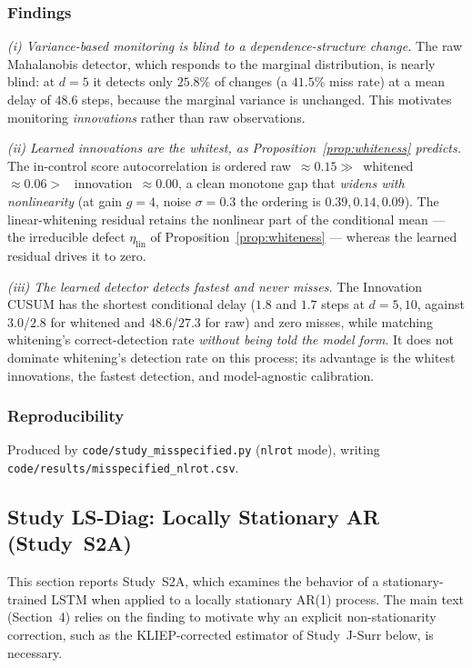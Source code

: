 \documentclass[bj,authoryear]{imsart}
\theoremstyle{plain}
\theoremstyle{definition}
\begin{document}
\subsubsection*{Findings}
\emph{(i) Variance-based monitoring is blind to a dependence-structure
change.}  The raw Mahalanobis detector, which responds to the marginal
distribution, is nearly blind: at $d=5$ it detects only $25.8\%$ of changes
(a $41.5\%$ miss rate) at a mean delay of $48.6$ steps, because the marginal
variance is unchanged.  This motivates monitoring \emph{innovations} rather
than raw observations.

\emph{(ii) Learned innovations are the whitest, as
Proposition~\ref{prop:whiteness} predicts.}  The in-control score
autocorrelation is ordered raw~$\approx0.15\gg$~whitened~$\approx0.06>$~
innovation~$\approx0.00$, a clean monotone gap that \emph{widens with
nonlinearity} (at gain $g=4$, noise $\sigma=0.3$ the ordering is
$0.39,0.14,0.09$).  The linear-whitening residual retains the nonlinear part
of the conditional mean --- the irreducible defect $\eta_{\mathrm{lin}}$ of
Proposition~\ref{prop:whiteness} --- whereas the learned residual drives it
to zero.

\emph{(iii) The learned detector detects fastest and never misses.}  The
Innovation CUSUM has the shortest conditional delay ($1.8$ and $1.7$ steps at
$d=5,10$, against $3.0$/$2.8$ for whitened and $48.6$/$27.3$ for raw) and zero
misses, while matching whitening's correct-detection rate \emph{without being
told the model form}.  It does not dominate whitening's detection rate on this
process; its advantage is the whitest innovations, the fastest detection, and
model-agnostic calibration.

\subsubsection*{Reproducibility}
Produced by \texttt{code/study\_\allowbreak misspecified.py} (\texttt{nlrot} mode),
writing \texttt{code/\allowbreak results/\allowbreak misspecified\_\allowbreak nlrot.csv}.

\subsection{Study LS-Diag: Locally Stationary AR (Study~S2A)}
\label{app:supp-lsdiag}

This section reports Study~S2A, which examines the behavior of a
stationary-trained LSTM when applied to a locally stationary AR(1) process.
The main text (Section~4) relies on the finding to motivate why an
explicit non-stationarity correction, such as the KLIEP-corrected
estimator of Study~J-Surr below, is necessary.
\end{document}
